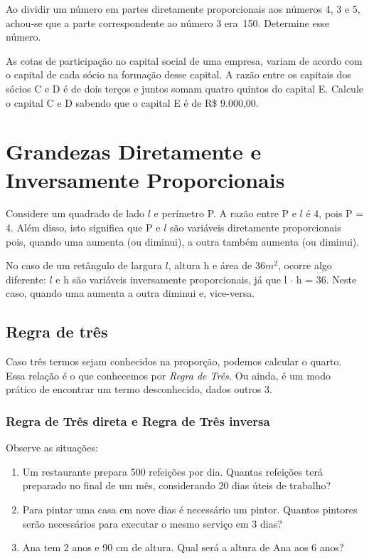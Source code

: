 \begin{exercicios}
	\exitem{} Ao dividir um número em partes diretamente proporcionais aos números 4, 3 e 5, achou-se que a parte correspondente ao número 3 era\ 150. Determine esse número.  

	\exitem{} As cotas de participação no capital social de uma empresa, variam de acordo com o capital de cada sócio na formação desse capital. A razão entre os capitais dos sócios C e D é de dois terços e juntos somam quatro quintos do capital E. Calcule o capital C e D sabendo que o capital E é de R\$  9.000,00. 

\end{exercicios}

\section{Grandezas Diretamente e Inversamente Proporcionais}

Considere um quadrado de lado $l$ e perímetro P. A razão entre P e $l$ é 4, pois P = 4. Além disso, isto significa que P e $l$ são variáveis diretamente proporcionais pois, quando uma aumenta (ou diminui), a outra também aumenta (ou diminui).

No caso de um retângulo de largura $l$, altura h e área de 36$m^2$, ocorre algo diferente:  $l$ e h são variáveis inversamente proporcionais, já que l $ \cdot $  h = 36. Neste caso, quando uma aumenta a outra diminui e, vice-versa.

\subsection{Regra de três}

\quad Caso três termos sejam conhecidos na proporção, podemos calcular o quarto. Essa relação é o que conhecemos por \textit{Regra de Três. }Ou ainda, é um modo prático de encontrar um termo desconhecido, dados outros 3. 

\subsubsection{Regra de Três direta e Regra de Três inversa}
\quad Observe as situações:

\begin{enumerate}[label=(\roman*)]
	\item Um restaurante prepara 500 refeições por dia. Quantas refeições terá preparado no final de um mês, considerando 20 dias úteis de trabalho?

	\item Para pintar uma casa em nove dias é necessário um pintor. Quantos pintores serão necessários para executar o mesmo serviço em 3 dias?

	\item  Ana tem 2 anos e 90 cm de altura. Qual será a altura de Ana aos 6 anos?
\end{enumerate}

